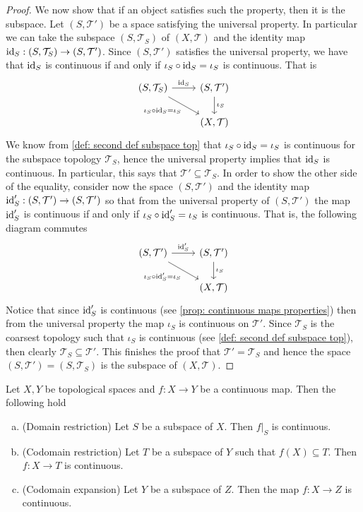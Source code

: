 \begin{proof}
  We now show that if an object satisfies such the property, then it is the
  subspace. Let \((S, \mathcal T')\) be a space satisfying the universal
  property. In particular we can take the subspace \((S, \mathcal T_S)\) of
  \((X, \mathcal T)\) and the identity map \(\operatorname{id}_S: (S, \mathcal T_S) \to (S,
  \mathcal T')\). Since \((S, \mathcal T')\) satisfies the universal property,
  we have that \(\operatorname{id}_S\) is continuous if and only if \(\iota_S \circ \operatorname{id}_S =
  \iota_S\) is continuous. That is
  \[
    \begin{tikzcd}
      (S, \mathcal T_S)
      \ar[r, "\Id_S"] 
      \ar[rd, swap, "\iota_S \circ \Id_S = \iota_S"]
        &(S, \mathcal T') \ar[d, "\iota_S"] \\
        &(X, \mathcal T)
    \end{tikzcd}
  \] 
  We know from \cref{def: second def subspace top} that \(\iota_S \circ \operatorname{id}_S =
  \iota_S\) is continuous for the subspace topology \(\mathcal T_S\), hence the
  universal property implies that \(\operatorname{id}_S\) is continuous. In particular, this
  says that \(\mathcal T' \subseteq \mathcal T_S\). In order to show the other
  side of the equality, consider now the space \((S, \mathcal T')\) and the
  identity map \(\operatorname{id}_S': (S, \mathcal T') \to (S, \mathcal T')\) so that from the
  universal property of \((S, \mathcal T')\) the map \(\operatorname{id}_S'\) is continuous if
  and only if \(\iota_S \circ \operatorname{id}_S' = \iota_S\) is continuous. That is, the
  following diagram commutes
  \[
    \begin{tikzcd}
      (S, \mathcal T') \ar[r, "\Id_S'"] 
      \ar[rd, swap, "\iota_S \circ \Id_S' = \iota_S"]
        &(S, \mathcal T') \ar[d, "\iota_S"] \\
        &(X, \mathcal T)
    \end{tikzcd}
  \] 
  Notice that since \(\operatorname{id}_S'\) is continuous (see \cref{prop: continuous maps
  properties}) then from the universal property the map \(\iota_S\) is
  continuous on \(\mathcal T'\). Since \(\mathcal T_S\) is the coarsest topology
  such that \(\iota_S\) is continuous (see \cref{def: second def subspace top}),
  then clearly \(\mathcal T_S \subseteq \mathcal T'\). This finishes the proof
  that \(\mathcal T' = \mathcal T_S\) and hence the space \((S, \mathcal T') =
  (S, \mathcal T_S)\) is the subspace of \((X, \mathcal T)\).
\end{proof}

\begin{corollary}\label{cor: subspace maps properties}
  Let \(X, Y\) be topological spaces and \(f: X \to Y\) be a continuous map.
  Then the following hold
  \begin{enumerate}[(a)]
    \item (Domain restriction) Let \(S\) be a subspace of \(X\). Then \(f|_S\)
      is continuous.
    \item (Codomain restriction) Let \(T\) be a subspace of \(Y\) such that
      \(f(X) \subseteq T\). Then \(f: X \to T\) is continuous.
    \item (Codomain expansion) Let \(Y\) be a subspace of \(Z\). Then the map
      \(f : X \to Z\) is continuous.
  \end{enumerate}
\end{corollary}

